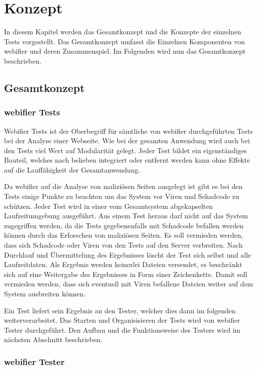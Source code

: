 \chapter{Konzept}

In diesem Kapitel werden das Gesamtkonzept und die Konzepte der einzelnen Tests vorgestellt. Das Gesamtkonzept umfasst die Einzelnen Komponenten von webifier und deren Zusammenspiel. Im Folgenden wird nun das Gesamtkonzept beschrieben.

\section{Gesamtkonzept}


\subsection{webifier Tests}
Webifier Tests ist der Oberbegriff für sämtliche von webifier durchgeführten Tests bei der Analyse einer Webseite. Wie bei der gesamten Anwendung wird auch bei den Tests viel Wert auf Modularität gelegt. Jeder Test bildet ein eigenständiges Bauteil, welches nach belieben integriert oder entfernt werden kann ohne Effekte auf die Lauffähigkeit der Gesamtanwendung.

Da webifier auf die Analyse von maliziösen Seiten ausgelegt ist gibt es bei den Tests einige Punkte zu beachten um das System vor Viren und Schadcode zu schützen.
Jeder Test wird in einer vom Gesamtsystem abgekapselten Laufzeitumgebung ausgeführt. Aus einem Test heraus darf nicht auf das System zugegriffen werden, da die Tests gegebenenfalls mit Schadcode befallen werden können durch das Erforschen von maliziösen Seiten. Es soll vermieden werden, dass sich Schadcode oder Viren von den Tests auf den Server verbreiten. Nach Durchlauf und Übermittelung des Ergebnisses löscht der Test sich selbst und alle Laufzeitdaten. Als Ergebnis werden keinerlei Dateien versendet, es beschränkt sich auf eine Weitergabe des Ergebnisses in Form einer Zeichenkette. Damit soll vermieden werden, dass sich eventuell mit Viren befallene Dateien weiter auf dem System ausbreiten können.

Ein Test liefert sein Ergebnis an den Tester, welcher dies dann im folgenden weiterverarbeitet.
Das Starten und Organisisieren der Tests wird von webifier Tester durchgeführt. Den Aufbau und die Funktionsweise des Testers wird im nächsten Abschnitt beschrieben.

\subsection{webifier Tester}

